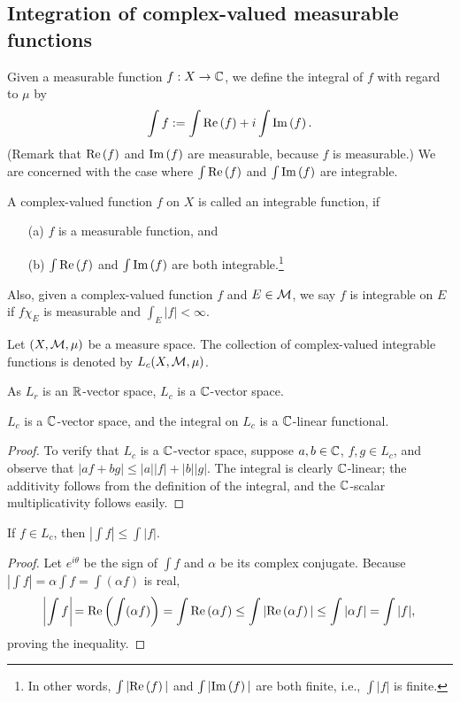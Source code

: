 \subsection{Integration of complex-valued measurable functions}

Given a measurable function $f: X\rightarrow{\mathbb{C}}$, we define the integral of $f$ with regard to $\mu$ by
\begin{align*}
    \int f:=\int\textrm{Re}\left({f}\right)+i\int\textrm{Im}\left({f}\right).
\end{align*}
(Remark that $\textrm{Re}\left({f}\right)$ and $\textrm{Im}\left({f}\right)$ are measurable, because $f$ is measurable.)
We are concerned with the case where $\int\textrm{Re}\left({f}\right)$ and $\int\textrm{Im}\left({f}\right)$ are integrable.
\begin{defi}
    A complex-valued function $f$ on $X$ is called an integrable function, if
    \begin{enumerate}
        \item[(a)]
        {
            $f$ is a measurable function, and
        }
        \item[(b)]
        {
            $\int\textrm{Re}\left({f}\right)$ and $\int\textrm{Im}\left({f}\right)$ are both integrable.\footnote{In other words, $\int |\textrm{Re}\left({f}\right)|$ and $\int |\textrm{Im}\left({f}\right)|$ are both finite, i.e., $\int|f|$ is finite.}
        }
    \end{enumerate}
    Also, given a complex-valued function $f$ and $E\in{\mathcal{M}}$, we say $f$ is integrable on $E$ if $f\chi_E$ is measurable and $\int_E|f|<\infty$.
\end{defi}
\begin{nota}
    Let $(X, {\mathcal{M}}, \mu)$ be a measure space.
    The collection of complex-valued integrable functions is denoted by $L_c(X, {\mathcal{M}}, \mu)$.
\end{nota}

As $L_r$ is an ${\mathbb{R}}$-vector space, $L_c$ is a ${\mathbb{C}}$-vector space.
\begin{prop}
    $L_c$ is a ${\mathbb{C}}$-vector space, and the integral on $L_c$ is a ${\mathbb{C}}$-linear functional.
\end{prop}
\begin{proof}
    To verify that $L_c$ is a ${\mathbb{C}}$-vector space, suppose $a, b\in{\mathbb{C}}$, $f, g\in L_c$, and observe that $|af+bg|\leq|a||f|+|b||g|$.
    The integral is clearly ${\mathbb{C}}$-linear; the additivity follows from the definition of the integral, and the ${\mathbb{C}}$-scalar multiplicativity follows easily.
\end{proof}

\begin{prop}
    If $f\in L_c$, then $|\int f|\leq\int|f|$.
\end{prop}
\begin{proof}
    Let $e^{i\theta}$ be the sign of $\int f$ and $\alpha$ be its complex conjugate.
    Because $|\int f|=\alpha\int f=\int(\alpha f)$ is real,
    \begin{align*}
        \vline\,\int f\,\vline=\real{\int(\alpha f)}=\int\real{\alpha f}\leq\int|\real{\alpha f}|\leq\int|\alpha f|=\int|f|,
    \end{align*}
    proving the inequality.
\end{proof}

